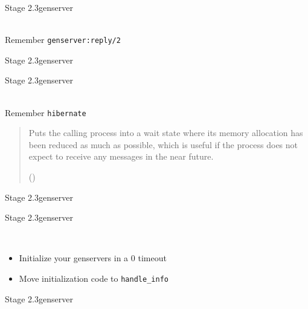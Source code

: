 \documentclass[utf8]{beamer}
\newenvironment{aquote}[1]{%
  \pushQED{#1}%
  \begin{quote}
}{%
  \par\noindent\hfill(\popQED)%
  \end{quote}%
}
\begin{document}
\begin{frame}{Stage 2.3}{gen\textunderscore server}
	\begin{description}
		\item<+->[Call Timeouts]\ \\
			Remember \texttt{gen\textunderscore server:reply/2}
	\end{description}
\end{frame}
\begin{frame}{Stage 2.3}{gen\textunderscore server}
\reply
\end{frame}
\begin{frame}{Stage 2.3}{gen\textunderscore server}
	\begin{description}
		\item<+->[Memory Footprint]\ \\
			Remember \texttt{hibernate}~\\
	\end{description}
	\begin{aquote}{Erlang Docs}
		Puts the calling process into a wait state where its memory allocation has been reduced as much as possible, which is useful if the process does not expect to receive any messages in the near future.
	\end{aquote}
\end{frame}
\begin{frame}{Stage 2.3}{gen\textunderscore server}
\hibernate
\end{frame}
\begin{frame}{Stage 2.3}{gen\textunderscore server}
	\begin{description}
		\item<+->[Long startup time]\ \\
			\begin{itemize}
				\item Initialize your gen\textunderscore servers in a $0$ timeout
				\item Move initialization code to \texttt{handle\_info}
			\end{itemize}
	\end{description}
\end{frame}
\begin{frame}{Stage 2.3}{gen\textunderscore server}
\init
\end{frame}
\end{document}

